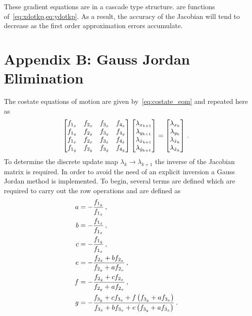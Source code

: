 \documentclass[preprint]{elsarticle}
\begin{document}
These gradient equations are in a cascade type structure.
 are functions of~\cref{eq:xdotkp,eq:ydotkp}.
As a result, the accuracy of the Jacobian will tend to decrease as the first order approximation errors accumulate.

\section*{Appendix B: Gauss Jordan Elimination}\label{sec:costate_gauss_jordan}
The costate equations of motion are given by~\cref{eq:costate_eom} and repeated here as
\begin{align}\label{eq:costate_eom_transpose}
	\begin{bmatrix} 
		f_{1_x} & f_{2_x} & f_{3_x} & f_{4_x} \\
		f_{1_y} & f_{2_y} & f_{3_y} & f_{4_y} \\
		f_{1_{\dot x}} & f_{2_{\dot x}} & f_{3_{\dot x}} & f_{4_{\dot x}} \\
		f_{1_{\dot y}} & f_{2_{\dot y}} & f_{3_{\dot y}} & f_{4_{\dot y}}
	\end{bmatrix}
	\begin{bmatrix} \lambda_{x_{k+1}} \\ \lambda_{y_{k+1}} \\ \lambda_{\dot{x}_{k+1}} \\ \lambda_{\dot{y}_{k+1}} \end{bmatrix}
	=
	\begin{bmatrix} \lambda_{x_k} \\ \lambda_{y_{k}} \\ \lambda_{\dot{x}_{k}} \\ \lambda_{\dot{x}_{k}} \end{bmatrix} \, .
\end{align}
To determine the discrete update map \( \lambda_k \to \lambda_{k+1}\) the inverse of the Jacobian matrix is required.
In order to avoid the need of an explicit inversion a Gauss Jordan method is implemented.
To begin, several terms are defined which are required to carry out the row operations and are defined as
\begin{subequations}\label{eq:ref_scale}
\begin{align}
	a &= -\frac{f_{1_y}}{f_{1_x}} \, ,\\
	b &= -\frac{f_{1_{\dot x}}}{f_{1_x}} \, , \\
	c &= -\frac{f_{1_{\dot y}}}{f_{1_x}} \, ,\\
	e &= -\frac{f_{2_{\dot x}} + b f_{2_x}}{f_{2_y} + a f_{2_x}} \, ,\\
	f &= -\frac{f_{2_{\dot y}} + c f_{2_x}}{f_{2_y} + a f_{2_x}} \, ,\\
	g &= -\frac{f_{3_{\dot y}} + c f_{3_x} + f \left( f_{3_y} + a f_{3_x} \right)}{f_{3_{\dot x}} + b f_{3_x} + e \left( f_{3_y} + a f_{3_x} \right)}\, .
\end{align}
\end{subequations}
\end{document}
